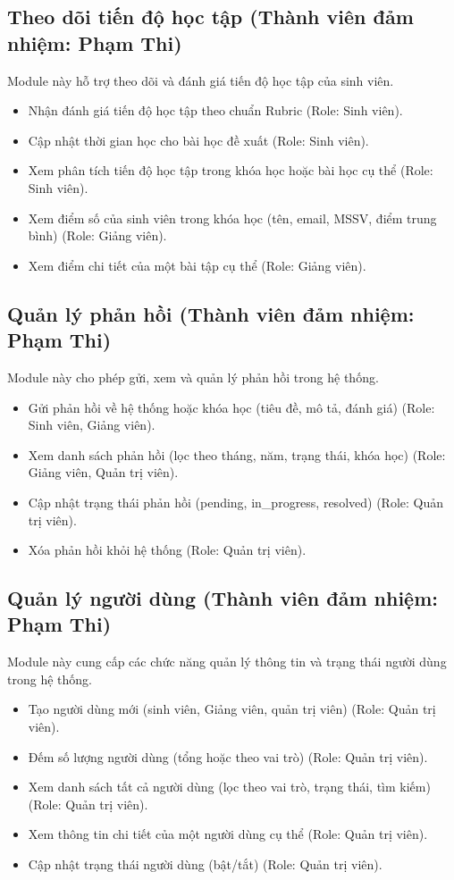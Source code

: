 \subsection{Theo dõi tiến độ học tập (Thành viên đảm nhiệm: Phạm Thi)}
Module này hỗ trợ theo dõi và đánh giá tiến độ học tập của sinh viên.
\begin{itemize}[label=--]
    \item Nhận đánh giá tiến độ học tập theo chuẩn Rubric (Role: Sinh viên).
    \item Cập nhật thời gian học cho bài học đề xuất (Role: Sinh viên).
    \item Xem phân tích tiến độ học tập trong khóa học hoặc bài học cụ thể (Role: Sinh viên).
    \item Xem điểm số của sinh viên trong khóa học (tên, email, MSSV, điểm trung bình) (Role: Giảng viên).
    \item Xem điểm chi tiết của một bài tập cụ thể (Role: Giảng viên).
\end{itemize}

\subsection{Quản lý phản hồi (Thành viên đảm nhiệm: Phạm Thi)}
Module này cho phép gửi, xem và quản lý phản hồi trong hệ thống.
\begin{itemize}[label=--]
    \item Gửi phản hồi về hệ thống hoặc khóa học (tiêu đề, mô tả, đánh giá) (Role: Sinh viên, Giảng viên).
    \item Xem danh sách phản hồi (lọc theo tháng, năm, trạng thái, khóa học) (Role: Giảng viên, Quản trị viên).
    \item Cập nhật trạng thái phản hồi (pending, in\_progress, resolved) (Role: Quản trị viên).
    \item Xóa phản hồi khỏi hệ thống (Role: Quản trị viên).
\end{itemize}

\subsection{Quản lý người dùng (Thành viên đảm nhiệm: Phạm Thi)}
Module này cung cấp các chức năng quản lý thông tin và trạng thái người dùng trong hệ thống.
\begin{itemize}[label=--]
    \item Tạo người dùng mới (sinh viên, Giảng viên, quản trị viên) (Role: Quản trị viên).
    \item Đếm số lượng người dùng (tổng hoặc theo vai trò) (Role: Quản trị viên).
    \item Xem danh sách tất cả người dùng (lọc theo vai trò, trạng thái, tìm kiếm) (Role: Quản trị viên).
    \item Xem thông tin chi tiết của một người dùng cụ thể (Role: Quản trị viên).
    \item Cập nhật trạng thái người dùng (bật/tắt) (Role: Quản trị viên).
\end{itemize}

